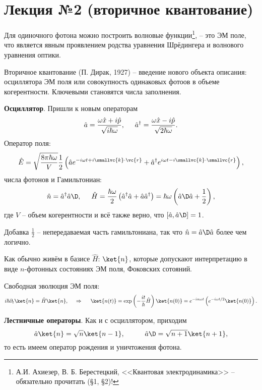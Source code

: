 \section*{Лекция №2 (вторичное квантование)}



Для одиночного фотона можно построить волновые функции\footnote{
    А.И. Ахиезер, В. Б. Берестецкий, <<Квантовая электродинамика>> -- обязательно прочитать (\S 1, \S 2)!
}, -- это ЭМ поле, что является явным проявлением родства уравнения Шрёдингера и волнового уравнения оптики.


Вторичное квантование (П. Дирак, 1927) -- введение нового объекта описания: осциллятора ЭМ поля или совокупность одинаковых фотоов в объеме когерентности. Ключевыми становятся числа заполнения. 


\textbf{Осциллятор}. Пришли к новым операторам
\begin{equation*}
    \hat{a} = \frac{\omega \hat{x} + i \hat{p}}{\sqrt{i \hbar \omega}},
    \hspace{5 mm} 
    \hat{a}^\dagger = \frac{\omega \hat{x} - i \hat{p}}{\sqrt{2 \hbar \omega}}.
\end{equation*}
Оператор поля:
\begin{equation*}
    \hat{E} = \sqrt{\frac{8 \pi \hbar \omega}{V}} \frac{1}{2}\left(
        \hat{a} e^{- i \omega t + i \smallvc{k} \cdot \vc{r}} + 
        \hat{a}^\dagger e^{i \omega t - i \smallvc{k} \cdot \smallvc{r}}
    \right),
\end{equation*}
числа фотонов и Гамильтониан:
\begin{equation*}
    \hat{n} = \hat{a}^\dagger \hat{a}\D,
    \hspace{5 mm} 
    \hat{H} = \frac{\hbar \omega}{2} \left(\hat{a}^\dagger \hat{a} + \hat{a} \hat{a}^\dagger\right)= \hbar \omega \left(\hat{a}\D \hat{a} + \frac{1}{2}\right),
\end{equation*}
где $V$ -- объем когерентности и всё также верно, что $[\hat{a}, \hat{a}\D] = 1$.

Добавка $\frac{1}{2}$ -- непередаваемая часть гамильтониана, так что $\hat{n} = \hat{a}\D \hat{a}$ более чем логично.


Как обычно живём в базисе $\hat{H}$: $\ket{n}$, которые допускают интерпретацию в виде $n$-фотонных состояниях ЭМ поля, Фоковских сотояний.

Свободная эволюция ЭМ поля:
\begin{equation*}
    i \hbar \partial_t \ket{n} = \hat{H} \ket{n},
    \hspace{0.5cm} \Rightarrow \hspace{0.5cm}
    \ket{n(t)} = \exp\left(
        - \frac{it}{\hbar} \hat{H}
    \right) \ket{n(0)} = e^{- i n \omega t} \left(
        e^{- i \omega t/2} \ket{n(0)}
    \right).
\end{equation*}

\textbf{Лестничные операторы}. Как и с осциллятором, приходим
\begin{equation*}
    \hat{a} \ket{n} = \sqrt{n} \ket{n-1},
    \hspace{10 mm} 
    \hat{a}\D = \sqrt{n+1} \ket{n+1},
\end{equation*}
то есть имеем оператор рождения и уничтожения фотона.